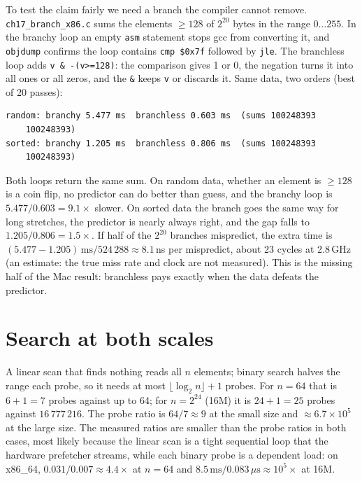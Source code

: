\begin{example}
To test the claim fairly we need a branch the compiler cannot remove.
\texttt{ch17\_branch\_x86.c} sums the elements $\ge 128$ of $2^{20}$
bytes in the range $0\dots255$. In the branchy loop an empty
\texttt{asm} statement stops gcc from converting it, and
\texttt{objdump} confirms the loop contains \texttt{cmp \$0x7f}
followed by \texttt{jle}. The branchless loop adds
\texttt{v \& -(v>=128)}: the comparison gives 1 or 0, the negation turns it
into all ones or all zeros, and the \texttt{\&} keeps \texttt{v} or
discards it. Same data, two orders (best of 20 passes):

{\scriptsize
\begin{verbatim}
random: branchy 5.477 ms  branchless 0.603 ms  (sums 100248393
    100248393)
sorted: branchy 1.205 ms  branchless 0.806 ms  (sums 100248393
    100248393)
\end{verbatim}
}
Both loops return the same sum. On random data, whether an element is
$\ge 128$ is a coin flip, no predictor can do better than guess, and
the branchy loop is $5.477/0.603=9.1\times$ slower. On sorted data
the branch goes the same way for long stretches, the predictor is
nearly always right, and the gap falls to $1.205/0.806=1.5\times$.
If half of the $2^{20}$ branches mispredict, the extra time is
$(5.477-1.205)\,\mathrm{ms}/524\,288\approx 8.1$\,ns per mispredict,
about 23 cycles at 2.8\,GHz (an estimate: the true miss rate and
clock are not measured). This is the missing half of the Mac
result: branchless pays exactly when the data defeats the predictor.
\end{example}


\section{Search at both scales}


\begin{example}
A linear scan that finds nothing reads all $n$ elements; binary
search halves the range each probe, so it needs at most
$\lfloor\log_2 n\rfloor+1$ probes. For $n=64$ that is $6+1=7$ probes
against up to 64; for $n=2^{24}$ (16M) it is $24+1=25$ probes against
$16\,777\,216$. The probe ratio is $64/7\approx 9$ at the small size
and $\approx 6.7\times 10^{5}$ at the large size. The measured ratios
are smaller than the probe ratios in both cases, most likely because the linear
scan is a tight sequential loop that the hardware prefetcher
streams, while each binary probe is a dependent load: on x86\_64,
$0.031/0.007\approx 4.4\times$ at $n=64$ and
$8.5\,\mathrm{ms}/0.083\,\mu\mathrm{s}\approx 10^{5}\times$ at 16M.
\end{example}


